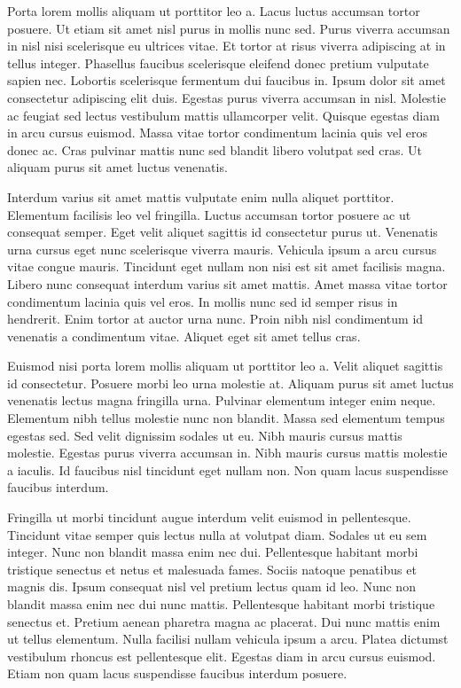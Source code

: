 \documentclass[11pt,a4paper]{article}
\begin{document}
Porta lorem mollis aliquam ut porttitor leo a. Lacus luctus accumsan tortor posuere. Ut etiam sit amet nisl purus in mollis nunc sed. Purus viverra accumsan in nisl nisi scelerisque eu ultrices vitae. Et tortor at risus viverra adipiscing at in tellus integer. Phasellus faucibus scelerisque eleifend donec pretium vulputate sapien nec. Lobortis scelerisque fermentum dui faucibus in. Ipsum dolor sit amet consectetur adipiscing elit duis. Egestas purus viverra accumsan in nisl. Molestie ac feugiat sed lectus vestibulum mattis ullamcorper velit. Quisque egestas diam in arcu cursus euismod. Massa vitae tortor condimentum lacinia quis vel eros donec ac. Cras pulvinar mattis nunc sed blandit libero volutpat sed cras. Ut aliquam purus sit amet luctus venenatis.

Interdum varius sit amet mattis vulputate enim nulla aliquet porttitor. Elementum facilisis leo vel fringilla. Luctus accumsan tortor posuere ac ut consequat semper. Eget velit aliquet sagittis id consectetur purus ut. Venenatis urna cursus eget nunc scelerisque viverra mauris. Vehicula ipsum a arcu cursus vitae congue mauris. Tincidunt eget nullam non nisi est sit amet facilisis magna. Libero nunc consequat interdum varius sit amet mattis. Amet massa vitae tortor condimentum lacinia quis vel eros. In mollis nunc sed id semper risus in hendrerit. Enim tortor at auctor urna nunc. Proin nibh nisl condimentum id venenatis a condimentum vitae. Aliquet eget sit amet tellus cras.

Euismod nisi porta lorem mollis aliquam ut porttitor leo a. Velit aliquet sagittis id consectetur. Posuere morbi leo urna molestie at. Aliquam purus sit amet luctus venenatis lectus magna fringilla urna. Pulvinar elementum integer enim neque. Elementum nibh tellus molestie nunc non blandit. Massa sed elementum tempus egestas sed. Sed velit dignissim sodales ut eu. Nibh mauris cursus mattis molestie. Egestas purus viverra accumsan in. Nibh mauris cursus mattis molestie a iaculis. Id faucibus nisl tincidunt eget nullam non. Non quam lacus suspendisse faucibus interdum.

Fringilla ut morbi tincidunt augue interdum velit euismod in pellentesque. Tincidunt vitae semper quis lectus nulla at volutpat diam. Sodales ut eu sem integer. Nunc non blandit massa enim nec dui. Pellentesque habitant morbi tristique senectus et netus et malesuada fames. Sociis natoque penatibus et magnis dis. Ipsum consequat nisl vel pretium lectus quam id leo. Nunc non blandit massa enim nec dui nunc mattis. Pellentesque habitant morbi tristique senectus et. Pretium aenean pharetra magna ac placerat. Dui nunc mattis enim ut tellus elementum. Nulla facilisi nullam vehicula ipsum a arcu. Platea dictumst vestibulum rhoncus est pellentesque elit. Egestas diam in arcu cursus euismod. Etiam non quam lacus suspendisse faucibus interdum posuere.
\end{document}
